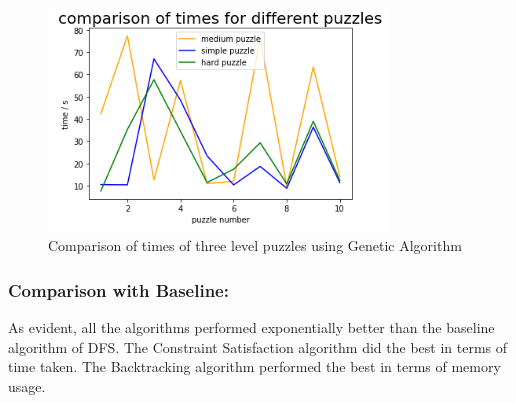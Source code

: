 \begin{figure} [htbp]
\centering
\includegraphics[width=90mm,scale=1]{figures/GA_result.png}
\caption{Comparison of times of three level puzzles using Genetic Algorithm}
\label{fig:ga_result}
\end{figure}

\subsubsection{Comparison with Baseline:}
As evident, all the algorithms performed exponentially better than the baseline algorithm of DFS. The Constraint Satisfaction algorithm did the best in terms of time taken. The Backtracking algorithm performed the best in terms of memory usage.